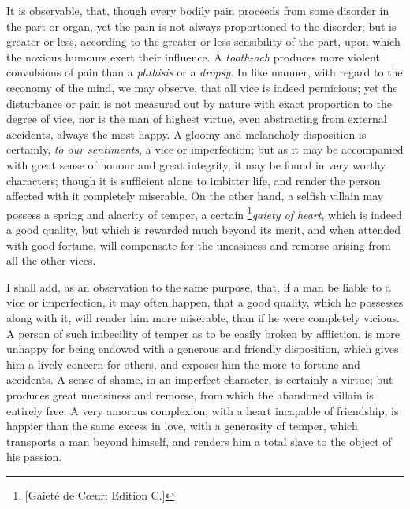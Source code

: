 It is observable, that, though every bodily pain proceeds from some
disorder in the part or organ, yet the pain is not always proportioned
to the disorder; but is greater or less, according to the greater or
less sensibility of the part, upon which the noxious humours exert
their influence. A \textit{tooth-ach} produces more violent
convulsions of pain than a \textit{phthisis} or a \textit{dropsy}. In
like manner, with regard to the {\oe}conomy of the mind, we may
observe, that all vice is indeed pernicious; yet the disturbance or
pain is not measured out by nature with exact proportion to the degree
of vice, nor is the man of highest virtue, even abstracting from
external accidents, always the most happy. A gloomy and melancholy
disposition is certainly, \textit{to our sentiments}, a vice or
imperfection; but as it may be accompanied with great sense of honour
and great integrity, it may be found in very worthy characters; though
it is sufficient alone to imbitter life, and render the person
affected with it completely miserable. On the other hand, a selfish
villain may possess a spring and alacrity of temper, a certain
\footnote{[Gaiet\'e de C{\oe}ur: Edition C.]}\textit{gaiety of heart},
which is indeed a good quality, but which is rewarded much beyond its
merit, and when attended with good fortune, will compensate for the
uneasiness and remorse arising from all the other vices.

I shall add, as an observation to the same purpose, that, if a man be
liable to a vice or imperfection, it may often happen, that a good
quality, which he possesses along with it,  will render him
more miserable, than if he were completely vicious. A person of such
imbecility of temper as to be easily broken by affliction, is more
unhappy for being endowed with a generous and friendly disposition,
which gives him a lively concern for others, and exposes him the more
to fortune and accidents. A sense of shame, in an imperfect character,
is certainly a virtue; but produces great uneasiness and remorse, from
which the abandoned villain is entirely free. A very amorous
complexion, with a heart incapable of friendship, is happier than the
same excess in love, with a generosity of temper, which transports a
man beyond himself, and renders him a total slave to the object of his
passion.

